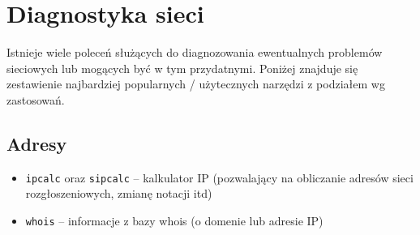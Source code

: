% 
% 
% 
% 

\section{Diagnostyka sieci}

Istnieje wiele poleceń służących do diagnozowania ewentualnych problemów sieciowych lub mogących być w tym przydatnymi.
Poniżej znajduje się zestawienie najbardziej popularnych / użytecznych narzędzi z podziałem wg zastosowań.

\subsection{Adresy}
\begin{itemize}
	\item \Verb#ipcalc# oraz \Verb#sipcalc# –
		kalkulator IP (pozwalający na obliczanie adresów sieci rozgłoszeniowych, zmianę notacji itd)
	\item \Verb#whois# –
		informacje z bazy whois (o domenie lub adresie IP)
\end{itemize}
				
